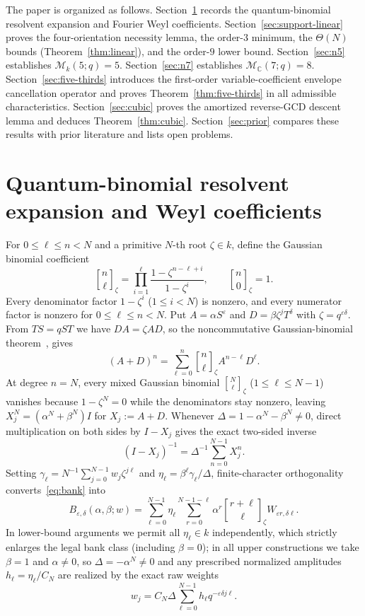\documentclass[11pt,reqno]{amsart}
\numberwithin{equation}{section}
\theoremstyle{definition}
\theoremstyle{remark}
\newcommand{\C}{\mathbb{C}}
\newcommand{\gb}[3]{\genfrac{[}{]}{0pt}{}{#1}{#2}_{#3}}
\newcommand{\eps}{\varepsilon}
\newcommand{\M}{\mathcal{M}}
\begin{document}
The paper is organized as follows. Section~\ref{sec:algebra} records the quantum-binomial resolvent expansion and Fourier Weyl coefficients. Section~\ref{sec:support-linear} proves the four-orientation necessity lemma, the order-$3$ minimum, the $\Theta(N)$ bounds (Theorem~\ref{thm:linear}), and the order-$9$ lower bound. Section~\ref{sec:n5} establishes $\M_k(5;q)=5$. Section~\ref{sec:n7} establishes $\M_{\C}(7;q)=8$. Section~\ref{sec:five-thirds} introduces the first-order variable-coefficient envelope cancellation operator and proves Theorem~\ref{thm:five-thirds} in all admissible characteristics. Section~\ref{sec:cubic} proves the amortized reverse-GCD descent lemma and deduces Theorem~\ref{thm:cubic}. Section~\ref{sec:prior} compares these results with prior literature and lists open problems.

\section{Quantum-binomial resolvent expansion and Weyl coefficients}
\label{sec:algebra}

For $0\le \ell\le n < N$ and a primitive $N$-th root $\zeta\in k$, define the Gaussian binomial coefficient
\[
\gb{n}{\ell}{\zeta} = \prod_{i=1}^{\ell} \frac{1 - \zeta^{n-\ell+i}}{1 - \zeta^i},
\qquad \gb{n}{0}{\zeta} = 1.
\]
Every denominator factor $1-\zeta^i$ ($1\le i<N$) is nonzero, and every numerator factor is nonzero for $0\le\ell\le n<N$. Put $A = \alpha S^\eps$ and $D = \beta\zeta^j T^\delta$ with $\zeta = q^{\eps\delta}$. From $TS = qST$ we have $DA = \zeta AD$, so the noncommutative Gaussian-binomial theorem~\cite[Theorems~1--2]{HMS04}, \cite[Proposition~1]{Sch12} gives
\[
(A+D)^n = \sum_{\ell=0}^n \gb{n}{\ell}{\zeta} A^{n-\ell} D^\ell.
\]
At degree $n=N$, every mixed Gaussian binomial $\gb{N}{\ell}{\zeta}$ ($1\le\ell\le N-1$) vanishes because $1-\zeta^N=0$ while the denominators stay nonzero, leaving $X_j^N = (\alpha^N+\beta^N)I$ for $X_j := A+D$. Whenever $\Delta = 1-\alpha^N-\beta^N\ne 0$, direct multiplication on both sides by $I-X_j$ gives the exact two-sided inverse
\begin{equation}
\label{eq:resolvent-inv}
(I - X_j)^{-1} = \Delta^{-1}\sum_{n=0}^{N-1} X_j^n.
\end{equation}
Setting $\gamma_\ell = N^{-1}\sum_{j=0}^{N-1} w_j\zeta^{j\ell}$ and $\eta_\ell = \beta^\ell\gamma_\ell/\Delta$, finite-character orthogonality converts~\eqref{eq:bank} into
\begin{equation}
\label{eq:bank-expansion}
B_{\eps,\delta}(\alpha,\beta;w)
= \sum_{\ell=0}^{N-1} \eta_\ell \sum_{r=0}^{N-1-\ell} \alpha^r \gb{r+\ell}{\ell}{\zeta} W_{\eps r,\delta\ell}.
\end{equation}
In lower-bound arguments we permit all $\eta_\ell\in k$ independently, which strictly enlarges the legal bank class (including $\beta=0$); in all upper constructions we take $\beta=1$ and $\alpha\ne 0$, so $\Delta=-\alpha^N\ne 0$ and any prescribed normalized amplitudes $h_\ell = \eta_\ell/C_N$ are realized by the exact raw weights
\begin{equation}
\label{eq:raw-weights}
w_j = C_N \Delta \sum_{\ell=0}^{N-1} h_\ell q^{-\eps\delta j\ell}.
\end{equation}
\end{document}

